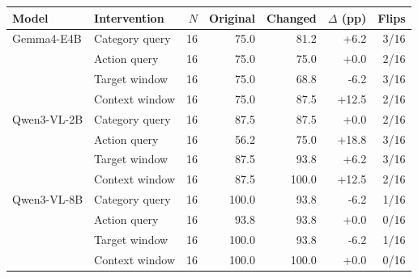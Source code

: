 \begin{tabular}{llrrrrr}
\toprule
Model & Intervention & $N$ & Original & Changed & $\Delta$ (pp) & Flips \\
\midrule
Gemma4-E4B & Category query & 16 & 75.0 & 81.2 & +6.2 & 3/16 \\
 & Action query & 16 & 75.0 & 75.0 & +0.0 & 2/16 \\
 & Target window & 16 & 75.0 & 68.8 & -6.2 & 3/16 \\
 & Context window & 16 & 75.0 & 87.5 & +12.5 & 2/16 \\
\midrule
Qwen3-VL-2B & Category query & 16 & 87.5 & 87.5 & +0.0 & 2/16 \\
 & Action query & 16 & 56.2 & 75.0 & +18.8 & 3/16 \\
 & Target window & 16 & 87.5 & 93.8 & +6.2 & 3/16 \\
 & Context window & 16 & 87.5 & 100.0 & +12.5 & 2/16 \\
\midrule
Qwen3-VL-8B & Category query & 16 & 100.0 & 93.8 & -6.2 & 1/16 \\
 & Action query & 16 & 93.8 & 93.8 & +0.0 & 0/16 \\
 & Target window & 16 & 100.0 & 93.8 & -6.2 & 1/16 \\
 & Context window & 16 & 100.0 & 100.0 & +0.0 & 0/16 \\
\bottomrule
\end{tabular}
